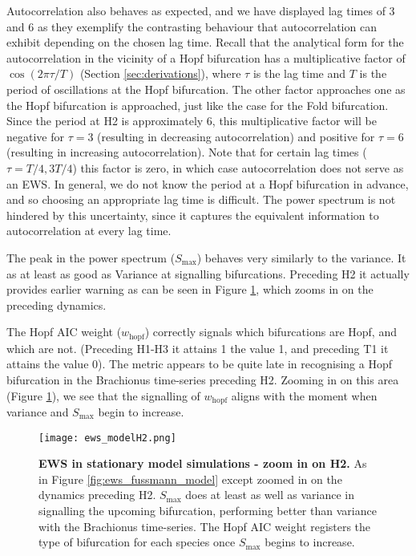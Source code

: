 \documentclass[10pt]{article}
\begin{document}
Autocorrelation also behaves as expected, and we have displayed lag times of 3 and 6 as they exemplify the contrasting behaviour that autocorrelation can exhibit depending on the chosen lag time. Recall that the analytical form for the autocorrelation in the vicinity of a Hopf bifurcation has a multiplicative factor of $\cos(2\pi\tau/T)$ (Section \ref{sec:derivations}), where $\tau$ is the lag time and $T$ is the period of oscillations at the Hopf bifurcation. The other factor approaches one as the Hopf bifurcation is approached, just like the case for the Fold bifurcation. Since the period at H2 is approximately 6, this multiplicative factor will be negative for $\tau=3$ (resulting in decreasing autocorrelation) and positive for $\tau=6$ (resulting in increasing autocorrelation). Note that for certain lag times ($\tau=T/4, 3T/4$) this factor is zero, in which case autocorrelation does not serve as an EWS. In general, we do not know the period at a Hopf bifurcation in advance, and so choosing an appropriate lag time is difficult. The power spectrum is not hindered by this uncertainty, since it captures the equivalent information to autocorrelation at every lag time\cite{box15}.

The peak in the power spectrum ($S_{\text{max}}$) behaves very similarly to the variance. It as at least as good as Variance at signalling bifurcations. Preceding H2 it actually provides earlier warning as can be seen in Figure \ref{fig:ews_fussmann_model_H2}, which zooms in on the preceding dynamics.

The Hopf AIC weight ($w_{\text{hopf}}$) correctly signals which bifurcations are Hopf, and which are not. (Preceding H1-H3 it attains 1 the value 1, and preceding T1 it attains the value 0). The metric appears to be quite late in recognising a Hopf bifurcation in the Brachionus time-series preceding H2. Zooming in on this area (Figure \ref{fig:ews_fussmann_model_H2}), we see that the signalling of $w_{\text{hopf}}$ aligns with the moment when variance and $S_{\text{max}}$ begin to increase.





\begin{figure}[H]
\centering
\texttt{[image: ews\_modelH2.png]}
\vspace{0.4cm}
\caption{\textbf{EWS in stationary model simulations - zoom in on H2.} As in Figure \ref{fig:ews_fussmann_model} except zoomed in on the dynamics preceding H2. $S_{\text{max}}$ does at least as well as variance in signalling the upcoming bifurcation, performing better than variance with the Brachionus time-series. The Hopf AIC weight registers the type of bifurcation for each species once $S_{\text{max}}$ begins to increase.} 
\label{fig:ews_fussmann_model_H2}
\end{figure}
\end{document}
